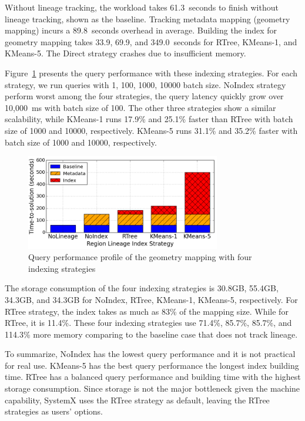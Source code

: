 \documentclass{sig-alternate}
\begin{document}
Without lineage tracking, the workload takes 61.3~seconds to finish without lineage tracking, shown as the baseline.
Tracking metadata mapping (geometry mapping) incurs a 89.8~seconds overhead in average. 
Building the index for geometry mapping takes 33.9, 69.9, and 349.0~seconds for RTree, KMeans-1, and KMeans-5.
The Direct strategy crashes due to insufficient memory.

Figure~\ref{fig:sift-query} presents the query performance with these indexing strategies.
For each strategy, we run queries with {1, 100, 1000, 10000} batch size.
NoIndex strategy perform worst among the four strategies, the query latency quickly grow over 10,000~ms with batch size of 100.
The other three strategies show a similar scalability, while KMeans-1 runs 17.9\% and 25.1\% faster than RTree with batch size of 1000 and 10000, respectively.
KMeans-5 runs  31.1\% and 35.2\% faster with batch size of 1000 and 10000, respectively.


\begin{figure}[t]
\begin{center}
    \includegraphics[width=85mm]{pictures/SIFTQuery-Time}
\caption {Query performance profile of the geometry mapping with four indexing strategies
    \label{fig:sift-query}
}
\end{center}
\end{figure}

The storage consumption of the four indexing strategies is 30.8GB, 55.4GB, 34.3GB, and 34.3GB 
for NoIndex, RTree, KMeans-1, KMeans-5, respectively. 
For RTree strategy, the index takes as much as 83\% of the mapping size. 
While for RTree, it is 11.4\%.
These four indexing strategies use 71.4\%, 85.7\%, 85.7\%, and 114.3\% more memory comparing to the
baseline case that does not track lineage.

To summarize, NoIndex has the lowest query performance and it is not practical for real use.
KMeans-5 has the best query performance the longest index building time.
RTree has a balanced query performance and building time with the highest storage consumption.
Since storage is not the major bottleneck given the machine capability, SystemX uses the RTree strategy
as default, leaving the RTree strategies as users' options.
\end{document}
